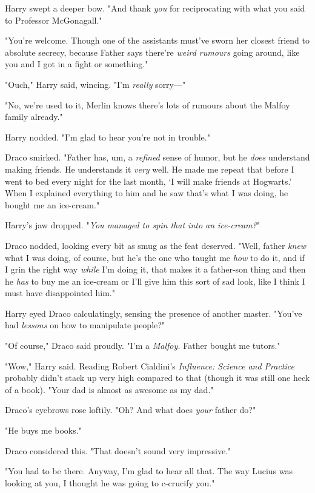 Harry swept a deeper bow. "And thank \emph{you} for reciprocating with what you
said to Professor McGonagall."

"You're welcome. Though one of the assistants must've sworn her closest friend
to absolute secrecy, because Father says there're \emph{weird rumours} going
around, like you and I got in a fight or something."

"Ouch," Harry said, wincing. "I'm \emph{really} sorry---"

"No, we're used to it, Merlin knows there's lots of rumours about the Malfoy
family already."

Harry nodded. "I'm glad to hear you're not in trouble."

Draco smirked. "Father has, um, a \emph{refined} sense of humor, but he
\emph{does} understand making friends. He understands it \emph{very} well. He
made me repeat that before I went to bed every night for the last month, `I
will make friends at Hogwarts.' When I explained everything to him and he saw
that's what I was doing, he bought me an ice-cream."

Harry's jaw dropped. "\emph{You managed to spin that into an ice-cream?}"

Draco nodded, looking every bit as smug as the feat deserved. "Well, father
\emph{knew} what I was doing, of course, but he's the one who taught me
\emph{how} to do it, and if I grin the right way \emph{while} I'm doing it,
that makes it a father-son thing and then he \emph{has} to buy me an ice-cream
or I'll give him this sort of sad look, like I think I must have disappointed
him."

Harry eyed Draco calculatingly, sensing the presence of another master. "You've
had \emph{lessons} on how to manipulate people?"

"Of course," Draco said proudly. "I'm a \emph{Malfoy.} Father bought me tutors."

"Wow," Harry said. Reading Robert Cialdini's \emph{Influence: Science and
Practice} probably didn't stack up very high compared to that (though it was
still one heck of a book). "Your dad is almost as awesome as my dad."

Draco's eyebrows rose loftily. "Oh? And what does \emph{your} father do?"

"He buys me books."

Draco considered this. "That doesn't sound very impressive."

"You had to be there. Anyway, I'm glad to hear all that. The way Lucius was
looking at you, I thought he was going to c-crucify you."

